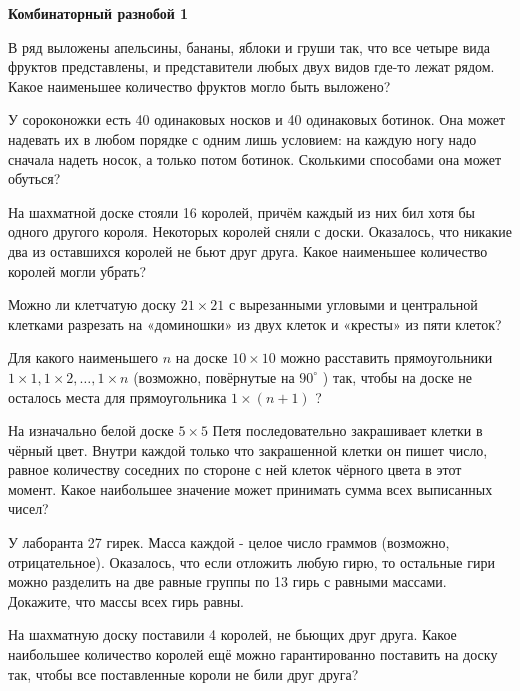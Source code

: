 \centerline{\bf \Huge Комбинаторный разнобой 1}

В ряд выложены апельсины, бананы, яблоки и груши так, что все четыре вида фруктов представлены, и представители любых двух видов где-то лежат рядом. Какое наименьшее количество фруктов могло быть выложено?

У сороконожки есть 40 одинаковых носков и 40 одинаковых ботинок. Она может надевать их в любом порядке с одним лишь условием: на каждую ногу надо сначала надеть носок, а только потом ботинок. Сколькими способами она может обуться?

На шахматной доске стояли 16 королей, причём каждый из них бил хотя бы одного другого короля. Некоторых королей сняли с доски. Оказалось, что никакие два из оставшихся королей не бьют друг друга. Какое наименьшее количество королей могли убрать?

Можно ли клетчатую доску $21 \times 21$ с вырезанными угловыми и центральной клетками разрезать на «доминошки» из двух клеток и «кресты» из пяти клеток?

Для какого наименьшего $n$ на доске $10 \times 10$ можно расставить прямоугольники $1 \times 1,1 \times 2, \ldots, 1 \times n$ (возможно, повёрнутые на $90^{\circ}$ ) так, чтобы на доске не осталось места для прямоугольника $1 \times(n+1)$ ?

На изначально белой доске $5 \times 5$ Петя последовательно закрашивает клетки в чёрный цвет. Внутри каждой только что закрашенной клетки он пишет число, равное количеству соседних по стороне с ней клеток чёрного цвета в этот момент. Какое наибольшее значение может принимать сумма всех выписанных чисел?

У лаборанта 27 гирек. Масса каждой - целое число граммов (возможно, отрицательное). Оказалось, что если отложить любую гирю, то остальные гири можно разделить на две равные группы по 13 гирь с равными массами. Докажите, что массы всех гирь равны.

На шахматную доску поставили 4 королей, не бьющих друг друга. Какое наибольшее количество королей ещё можно гарантированно поставить на доску так, чтобы все поставленные короли не били друг друга?